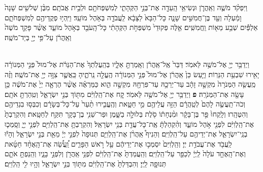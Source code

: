 \documentclass[twoside, openany, parskip=half, 11pt]{book}
\begin{document}
\begin{footnotesize}
\begin{multicols}{2}

 וַיִּפְקֹ֨ד מֹשֶׁ֧ה וְאַֽהֲרֹ֛ן וּנְשִׂיאֵ֥י הָֽעֵדָ֖ה אֶת־בְּנֵ֣י הַקְּהָתִ֑י לְמִשְׁפְּחֹתָ֖ם וּלְבֵ֥ית אֲבֹתָֽם׃ מִבֶּ֨ן שְׁלשִׁ֤ים שָׁנָה֙ וָמַ֔עְלָה וְעַ֖ד בֶּן־חֲמִשִּׁ֣ים שָׁנָ֑ה כָּל־הַבָּא֙ לַצָּבָ֔א לַֽעֲבֹדָ֖ה בְּאֹ֥הֶל מוֹעֵֽד׃ וַיִּֽהְי֥וּ פְקֻֽדֵיהֶ֖ם לְמִשְׁפְּחֹתָ֑ם אַלְפַּ֕יִם שְׁבַ֥ע מֵא֖וֹת וַֽחֲמִשִּֽׁים׃ אֵ֤לֶּה פְקוּדֵי֙ מִשְׁפְּחֹ֣ת הַקְּהָתִ֔י כָּל־הָֽעֹבֵ֖ד בְּאֹ֣הֶל מוֹעֵ֑ד אֲשֶׁ֨ר פָּקַ֤ד מֹשֶׁה֙ וְאַֽהֲרֹ֔ן עַל־פִּ֥י יְיָ֖ בְּיַד־מֹשֶֽׁה׃


\\
 וַיְדַבֵּ֥ר יְיָ֖ אֶל־מֹשֶׁ֥ה לֵּאמֹֽר׃ דַּבֵּר֙ אֶֽל־אַֽהֲרֹ֔ן וְאָֽמַרְתָּ֖ אֵלָ֑יו בְּהַֽעֲלֹֽתְךָ֙ אֶת־הַנֵּרֹ֔ת אֶל־מוּל֙ פְּנֵ֣י הַמְּנוֹרָ֔ה יָאִ֖ירוּ שִׁבְעַ֥ת הַנֵּרֽוֹת׃ וַיַּ֤עַשׂ כֵּן֙ אַֽהֲרֹ֔ן אֶל־מוּל֙ פְּנֵ֣י הַמְּנוֹרָ֔ה הֶֽעֱלָ֖ה נֵֽרֹתֶ֑יהָ כַּֽאֲשֶׁ֛ר צִוָּ֥ה יְיָ֖ אֶת־מֹשֶֽׁה׃ וְזֶ֨ה מַֽעֲשֵׂ֤ה הַמְּנֹרָה֙ מִקְשָׁ֣ה זָהָ֔ב עַד־יְרֵכָ֥הּ עַד־פִּרְחָ֖הּ מִקְשָׁ֣ה הִ֑וא כַּמַּרְאֶ֗ה אֲשֶׁ֨ר הֶרְאָ֤ה יְיָ֙ אֶת־מֹשֶׁ֔ה כֵּ֥ן עָשָׂ֖ה אֶת־הַמְּנֹרָֽה׃ \textbf{פ} 
וַיְדַבֵּ֥ר יְיָ֖ אֶל־מֹשֶׁ֥ה לֵּאמֹֽר׃ קַ֚ח אֶת־הַֽלְוִיִּ֔ם מִתּ֖וֹךְ בְּנֵ֣י יִשְׂרָאֵ֑ל וְטִֽהַרְתָּ֖ אֹתָֽם׃ וְכֹה־תַֽעֲשֶׂ֤ה לָהֶם֙ לְטַֽהֲרָ֔ם הַזֵּ֥ה עֲלֵיהֶ֖ם מֵ֣י חַטָּ֑את וְהֶֽעֱבִ֤ירוּ תַ֨עַר֙ עַל־כָּל־בְּשָׂרָ֔ם וְכִבְּס֥וּ בִגְדֵיהֶ֖ם וְהִטֶּהָֽרוּ׃ וְלָֽקְחוּ֙ פַּ֣ר בֶּן־בָּקָ֔ר וּמִ֨נְחָת֔וֹ סֹ֖לֶת בְּלוּלָ֣ה בַשָּׁ֑מֶן וּפַר־שֵׁנִ֥י בֶן־בָּקָ֖ר תִּקַּ֥ח לְחַטָּֽאת׃ וְהִקְרַבְתָּ֙ אֶת־הַֽלְוִיִּ֔ם לִפְנֵ֖י אֹ֣הֶל מוֹעֵ֑ד וְהִ֨קְהַלְתָּ֔ אֶֽת־כָּל־עֲדַ֖ת בְּנֵ֥י יִשְׂרָאֵֽל׃  וְהִקְרַבְתָּ֥ אֶת־הַֽלְוִיִּ֖ם לִפְנֵ֣י יְיָ֑ וְסָֽמְכ֧וּ בְנֵֽי־יִשְׂרָאֵ֛ל אֶת־יְדֵיהֶ֖ם עַל־הַֽלְוִיִּֽם׃ וְהֵנִיף֩ אַֽהֲרֹ֨ן אֶת־הַֽלְוִיִּ֤ם תְּנוּפָה֙ לִפְנֵ֣י יְיָ֔ מֵאֵ֖ת בְּנֵ֣י יִשְׂרָאֵ֑ל וְהָי֕וּ לַֽעֲבֹ֖ד אֶת־עֲבֹדַ֥ת יְיָ׃ וְהַֽלְוִיִּם֙ יִסְמְכ֣וּ אֶת־יְדֵיהֶ֔ם עַ֖ל רֹ֣אשׁ הַפָּרִ֑ים וַֽ֠עֲשֵׂ֠ה אֶת־הָֽאֶחָ֨ד חַטָּ֜את וְאֶת־הָֽאֶחָ֤ד עֹלָה֙ לַֽיְיָ֔ לְכַפֵּ֖ר עַל־הַֽלְוִיִּֽם׃ וְהַֽעֲמַדְתָּ֙ אֶת־הַֽלְוִיִּ֔ם לִפְנֵ֥י אַֽהֲרֹ֖ן וְלִפְנֵ֣י בָנָ֑יו וְהֵֽנַפְתָּ֥ אֹתָ֛ם תְּנוּפָ֖ה לַֽיְיָ׃ וְהִבְדַּלְתָּ֙ אֶת־הַֽלְוִיִּ֔ם מִתּ֖וֹךְ בְּנֵ֣י יִשְׂרָאֵ֑ל וְהָ֥יוּ לִ֖י הַֽלְוִיִּֽם׃


\end{multicols}
\end{footnotesize}
\end{document}
